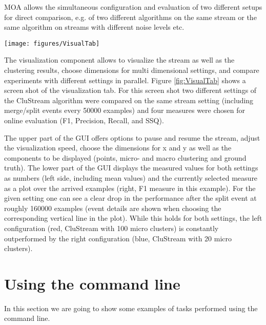 \documentclass[a4paper,12pt,twoside]{book}
\begin{document}
MOA allows the simultaneous configuration and evaluation of two different setups for direct comparison, e.g. of two different algorithms 
on the same stream or the same algorithm on streams with different noise levels etc.

\begin{figure*}[t]
\begin{center} 
\texttt{[image: figures/VisualTab]}
\end{center} 
\caption{Visualization tab of the clustering MOA graphical user interface.}
\label{fig:VisualTab}
\end{figure*}

The visualization component allows to visualize the stream as well as the clustering results, choose dimensions for multi dimensional settings, and compare experiments with different settings in parallel. 
Figure \ref{fig:VisualTab} shows a screen shot of the visualization tab. 
For this screen shot two different settings of the CluStream algorithm were compared on the same stream setting (including merge/split events every 50000 examples) 
and four measures were chosen for online evaluation (F1, Precision, Recall, and SSQ). 

The upper part of the GUI offers options to pause and resume the stream, adjust the visualization speed, choose the dimensions for x and y as well as the components to be displayed 
(points, micro- and macro clustering and ground truth). The lower part of the GUI displays the measured values for both settings as numbers 
(left side, including mean values) and the currently selected measure as a plot over the arrived examples (right, F1 measure in this example).
 For the given setting one can see a clear drop in the performance after the split event at roughly 160000 examples 
(event details are shown when choosing the corresponding vertical line in the plot). 
While this holds for both settings, the left configuration (red, CluStream with 100 micro clusters) is constantly outperformed by the right configuration 
(blue, CluStream with 20 micro clusters). 



\section{Using the command line}

In this section we are going to show some examples of tasks performed using the command line.
\end{document}
